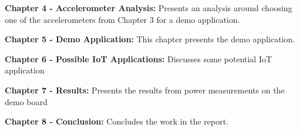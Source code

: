 \textbf{Chapter 4 - Accelerometer Analysis:} Presents an analysis around choosing one of the accelerometers from Chapter 3 for a demo application.

\textbf{Chapter 5 - Demo Application:} This chapter presents the demo application.

\textbf{Chapter 6 - Possible IoT Applications:} Discusses some potential IoT application

\textbf{Chapter 7 - Results:} Presents the results from power measurements on the demo board

\textbf{Chapter 8 - Conclusion:} Concludes the work in the report.

